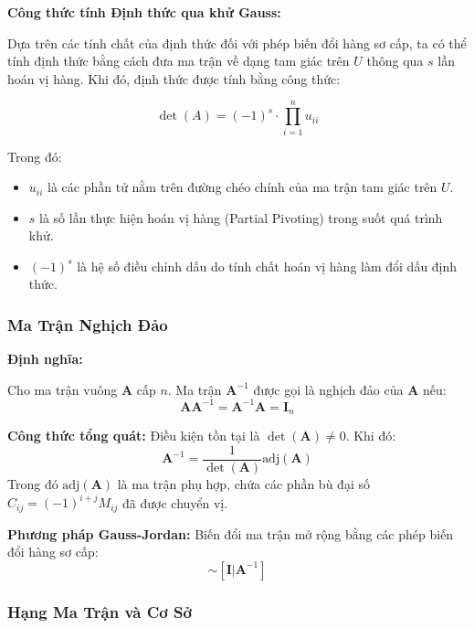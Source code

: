 \documentclass[a4paper]{article}
\begin{document}
\textbf{Công thức tính Định thức qua khử Gauss:}

Dựa trên các tính chất của định thức đối với phép biến đổi hàng sơ cấp, ta có thể tính định thức bằng cách đưa ma trận về dạng tam giác trên $U$ thông qua $s$ lần hoán vị hàng. Khi đó, định thức được tính bằng công thức:

\begin{equation}
\det(A) = (-1)^s \cdot \prod_{i=1}^{n} u_{ii}
\end{equation}

Trong đó:
\begin{itemize}
    \item $u_{ii}$ là các phần tử nằm trên đường chéo chính của ma trận tam giác trên $U$.
    \item $s$ là số lần thực hiện hoán vị hàng (Partial Pivoting) trong suốt quá trình khử.
    \item $(-1)^s$ là hệ số điều chỉnh dấu do tính chất hoán vị hàng làm đổi dấu định thức.
\end{itemize}


\subsubsection{Ma Trận Nghịch Đảo}
\textbf{Định nghĩa: }

Cho ma trận vuông $\mathbf{A}$ cấp $n$. Ma trận $\mathbf{A}^{-1}$ được gọi là nghịch đảo của $\mathbf{A}$ nếu:
\begin{equation}
    \mathbf{A}\mathbf{A}^{-1} = \mathbf{A}^{-1}\mathbf{A} = \mathbf{I}_n
\end{equation}

\textbf{Công thức tổng quát: }
Điều kiện tồn tại là $\det(\mathbf{A}) \neq 0$. Khi đó:
\begin{equation}
    \mathbf{A}^{-1} = \frac{1}{\det(\mathbf{A})} \text{adj}(\mathbf{A})
\end{equation}
Trong đó $\text{adj}(\mathbf{A})$ là ma trận phụ hợp, chứa các phần bù đại số $C_{ij} = (-1)^{i+j}M_{ij}$ đã được chuyển vị.

\textbf{Phương pháp Gauss-Jordan: }
Biến đổi ma trận mở rộng bằng các phép biến đổi hàng sơ cấp:
\begin{equation}
    [\mathbf{A} | \mathbf{I}] \sim [\mathbf{I} | \mathbf{A}^{-1}]
\end{equation}

\subsubsection{Hạng Ma Trận và Cơ Sở}
\end{document}
